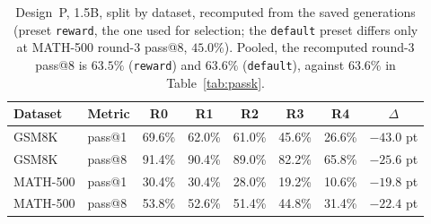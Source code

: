 \documentclass[runningheads]{llncs}
\begin{document}
\begin{table}[t]
\caption{Design~P, 1.5B, split by dataset, recomputed from the saved
generations (preset \texttt{reward}, the one used for selection; the
\texttt{default} preset differs only at MATH-500 round-3 pass@8, $45.0\%$).
Pooled, the recomputed round-3 pass@8 is $63.5\%$ (\texttt{reward}) and
$63.6\%$ (\texttt{default}), against $63.6\%$ in Table~\ref{tab:passk}.}
\label{tab:bydataset}
\centering
\begin{tabular}{llccccc c}
\toprule
Dataset & Metric & R0 & R1 & R2 & R3 & R4 & $\Delta$ \\
\midrule
GSM8K & pass@1 & 69.6\% & 62.0\% & 61.0\% & 45.6\% & 26.6\% & $-43.0$ pt \\
GSM8K & pass@8 & 91.4\% & 90.4\% & 89.0\% & 82.2\% & 65.8\% & $-25.6$ pt \\
MATH-500 & pass@1 & 30.4\% & 30.4\% & 28.0\% & 19.2\% & 10.6\% & $-19.8$ pt \\
MATH-500 & pass@8 & 53.8\% & 52.6\% & 51.4\% & 44.8\% & 31.4\% & $-22.4$ pt \\
\bottomrule
\end{tabular}
\end{table}
\end{document}
